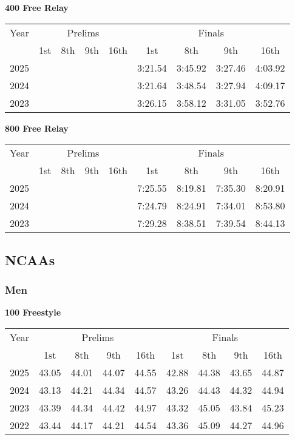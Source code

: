 \textbf{400 Free Relay}

\begin{flushleft}
\begin{tabular}{|c|c|c|c|c|c|c|c|c|}
\hline
Year & \multicolumn{4}{c|}{Prelims} & \multicolumn{4}{c|}{Finals} \\
\cline{2-9}
& 1st & 8th & 9th & 16th & 1st & 8th & 9th & 16th \\
\hline
2025 &  &  &  &  & 3:21.54 & 3:45.92 & 3:27.46 & 4:03.92 \\
2024 &  &  &  &  & 3:21.64 & 3:48.54 & 3:27.94 & 4:09.17 \\
2023 &  &  &  &  & 3:26.15 & 3:58.12 & 3:31.05 & 3:52.76 \\
\hline
\end{tabular}
\end{flushleft}

\textbf{800 Free Relay}

\begin{flushleft}
\begin{tabular}{|c|c|c|c|c|c|c|c|c|}
\hline
Year & \multicolumn{4}{c|}{Prelims} & \multicolumn{4}{c|}{Finals} \\
\cline{2-9}
& 1st & 8th & 9th & 16th & 1st & 8th & 9th & 16th \\
\hline
2025 &  &  &  &  & 7:25.55 & 8:19.81 & 7:35.30 & 8:20.91 \\
2024 &  &  &  &  & 7:24.79 & 8:24.91 & 7:34.01 & 8:53.80 \\
2023 &  &  &  &  & 7:29.28 & 8:38.51 & 7:39.54 & 8:44.13 \\
\hline
\end{tabular}
\end{flushleft}

\subsection{NCAAs}

\subsubsection{Men}

\textbf{100 Freestyle}

\begin{flushleft}
\begin{tabular}{|c|c|c|c|c|c|c|c|c|}
\hline
Year & \multicolumn{4}{c|}{Prelims} & \multicolumn{4}{c|}{Finals} \\
\cline{2-9}
& 1st & 8th & 9th & 16th & 1st & 8th & 9th & 16th \\
\hline
2025 & 43.05 & 44.01 & 44.07 & 44.55 & 42.88 & 44.38 & 43.65 & 44.87 \\
2024 & 43.13 & 44.21 & 44.34 & 44.57 & 43.26 & 44.43 & 44.32 & 44.94 \\
2023 & 43.39 & 44.34 & 44.42 & 44.97 & 43.32 & 45.05 & 43.84 & 45.23 \\
2022 & 43.44 & 44.17 & 44.21 & 44.54 & 43.36 & 45.09 & 44.27 & 44.96 \\
\hline
\end{tabular}
\end{flushleft}

